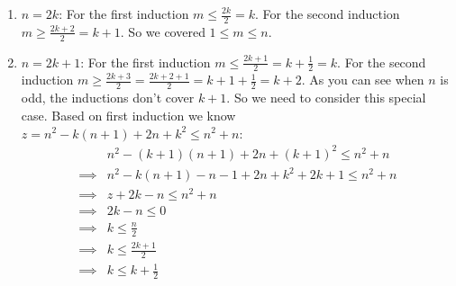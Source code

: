 \documentclass{book}
\begin{document}
	\begin{enumerate}
		\item $n = 2k$: For the first induction $m \le \frac{2k}{2} = k$. For the second induction $m \ge \frac{2k + 2}{2} = k + 1$. So we covered $1 \le m \le n$.
		\item $n = 2k + 1$: For the first induction $m \le \frac{2k + 1}{2} = k + \frac{1}{2} = k$. For the second induction $m \ge \frac{2k + 3}{2} = \frac{2k + 2 + 1}{2} = k + 1 + \frac{1}{2} = k + 2$. As you can see when $n$ is odd, the inductions don't cover $k + 1$. So we need to consider this special case. Based on first induction we know $z = n^2 - k(n + 1) + 2n + k^2 \le n^2 + n$:
		\begin{equation*}
			\begin{split}
				&n^2 - (k + 1)(n + 1) + 2n + (k + 1)^2 \le n^2 + n \\
				\implies&n^2 - k(n + 1) - n - 1 + 2n + k^2 + 2k + 1 \le n^2 + n \\
				\implies &z + 2k - n \le n^2 + n \\
				\implies &2k - n \le 0 \\
				\implies &k \le \frac{n}{2} \\
				\implies &k \le \frac{2k + 1}{2} \\
				\implies &k \le k + \frac{1}{2} 
			\end{split}
		\end{equation*}
	\end{enumerate}
\end{document}
